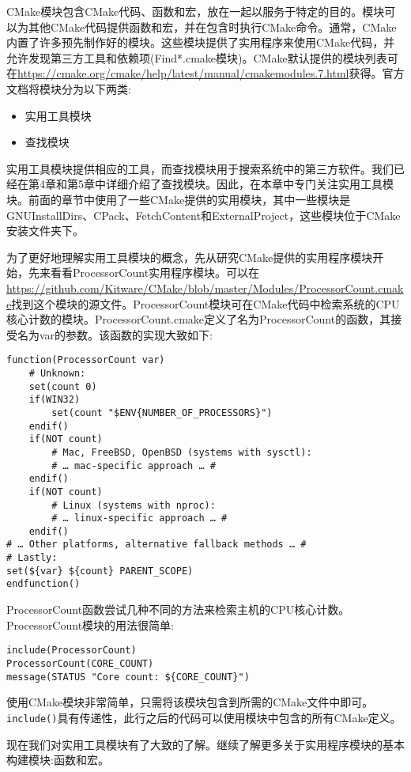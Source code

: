 CMake模块包含CMake代码、函数和宏，放在一起以服务于特定的目的。模块可以为其他CMake代码提供函数和宏，并在包含时执行CMake命令。通常，CMake内置了许多预先制作好的模块。这些模块提供了实用程序来使用CMake代码，并允许发现第三方工具和依赖项(Find*.cmake模块)。CMake默认提供的模块列表可在\url{https://cmake.org/cmake/help/latest/manual/cmakemodules.7.html}获得。官方文档将模块分为以下两类:

\begin{itemize}
\item 
实用工具模块

\item 
查找模块
\end{itemize}

实用工具模块提供相应的工具，而查找模块用于搜索系统中的第三方软件。我们已经在第4章和第5章中详细介绍了查找模块。因此，在本章中专门关注实用工具模块。前面的章节中使用了一些CMake提供的实用模块，其中一些模块是GNUInstallDirs、CPack、FetchContent和ExternalProject，这些模块位于CMake安装文件夹下。

为了更好地理解实用工具模块的概念，先从研究CMake提供的实用程序模块开始，先来看看ProcessorCount实用程序模块。可以在\url{https://github.com/Kitware/CMake/blob/master/Modules/ProcessorCount.cmake}找到这个模块的源文件。ProcessorCount模块可在CMake代码中检索系统的CPU核心计数的模块。ProcessorCount.cmake定义了名为ProcessorCount的函数，其接受名为var的参数。该函数的实现大致如下:

\begin{lstlisting}[style=styleCMake]
function(ProcessorCount var)
	# Unknown:
	set(count 0)
	if(WIN32)
		set(count "$ENV{NUMBER_OF_PROCESSORS}")
	endif()
	if(NOT count)
		# Mac, FreeBSD, OpenBSD (systems with sysctl):
		# … mac-specific approach … #
	endif()
	if(NOT count)
		# Linux (systems with nproc):
		# … linux-specific approach … #
	endif()
# … Other platforms, alternative fallback methods … #
# Lastly:
set(${var} ${count} PARENT_SCOPE)
endfunction()
\end{lstlisting}

ProcessorCount函数尝试几种不同的方法来检索主机的CPU核心计数。ProcessorCount模块的用法很简单:

\begin{lstlisting}[style=styleCMake]
include(ProcessorCount)
ProcessorCount(CORE_COUNT)
message(STATUS "Core count: ${CORE_COUNT}")
\end{lstlisting}

使用CMake模块非常简单，只需将该模块包含到所需的CMake文件中即可。\texttt{include()}具有传递性，此行之后的代码可以使用模块中包含的所有CMake定义。

现在我们对实用工具模块有了大致的了解。继续了解更多关于实用程序模块的基本构建模块:函数和宏。



























